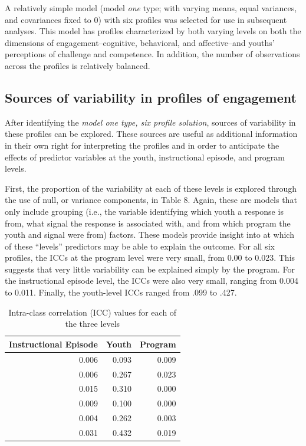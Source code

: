 \documentclass[]{msu-thesis}
\theoremstyle{definition}
\theoremstyle{definition}
\theoremstyle{definition}
\theoremstyle{remark}
\begin{document}
A relatively simple model (model \emph{one} type; with varying means,
equal variances, and covariances fixed to 0) with six profiles was
selected for use in subsequent analyses. This model has profiles
characterized by both varying levels on both the dimensions of
engagement--cognitive, behavioral, and affective--and youths'
perceptions of challenge and competence. In addition, the number of
observations across the profiles is relatively balanced.

\subsection{Sources of variability in profiles of
engagement}\label{sources-of-variability-in-profiles-of-engagement}

After identifying the \emph{model one type, six profile solution},
sources of variability in these profiles can be explored. These sources
are useful as additional information in their own right for interpreting
the profiles and in order to anticipate the effects of predictor
variables at the youth, instructional episode, and program levels.

First, the proportion of the variability at each of these levels is
explored through the use of null, or variance components, in Table 8.
Again, these are models that only include grouping (i.e., the variable
identifying which youth a response is from, what signal the response is
associated with, and from which program the youth and signal were from)
factors. These models provide insight into at which of these ``levels''
predictors may be able to explain the outcome. For all six profiles, the
ICCs at the program level were very small, from 0.00 to 0.023. This
suggests that very little variability can be explained simply by the
program. For the instructional episode level, the ICCs were also very
small, ranging from 0.004 to 0.011. Finally, the youth-level ICCs ranged
from .099 to .427.

\begin{landscape}\begin{table}

\caption{\label{tab:unnamed-chunk-11}Intra-class correlation (ICC) values for each of the three levels}
\centering
\begin{tabular}[t]{rrr}
\toprule
Instructional Episode & Youth & Program\\
\midrule
0.006 & 0.093 & 0.009\\
0.006 & 0.267 & 0.023\\
0.015 & 0.310 & 0.000\\
0.009 & 0.100 & 0.000\\
0.004 & 0.262 & 0.003\\
0.031 & 0.432 & 0.019\\
\bottomrule
\end{tabular}
\end{table}
\end{landscape}
\end{document}

